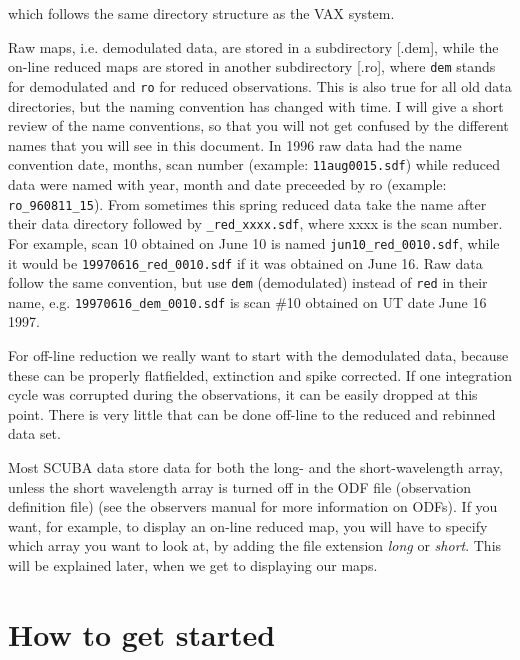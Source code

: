 \documentclass[twoside,11pt]{article}
\newcommand{\xlabel}[1]{}
\begin{document}
which follows the same directory structure as the VAX system.

Raw maps, i.e. demodulated data, are stored in a subdirectory [.dem],
while the on-line reduced maps are stored in another subdirectory
[.ro], where \texttt{dem} stands for demodulated and \texttt{ro} for
reduced observations. This is also true for all old data directories,
but the naming convention has changed with time. I will give a short
review of the name conventions, so that you will not get confused by
the different names that you will see in this document. In 1996 raw
data had the name convention date, months, scan number (example:
\texttt{11aug0015.sdf}) while reduced data were named with year, month
and date preceeded by ro (example: \texttt{ro\_960811\_15}). From
sometimes this spring reduced data take the name after their data
directory followed by \texttt{\_red\_xxxx.sdf}, where xxxx is the scan
number. For example, scan 10 obtained on June 10 is named
\texttt{jun10\_red\_0010.sdf}, while it would be
\texttt{19970616\_red\_0010.sdf} if it was obtained on June 16. Raw
data follow the same convention, but use \texttt{dem} (demodulated)
instead of \texttt{red} in their name, e.g.
\texttt{19970616\_dem\_0010.sdf} is scan \#10 obtained on UT date June
16 1997.

For off-line reduction we really want to start with the demodulated
data, because these can be properly flatfielded, extinction and spike
corrected. If one integration cycle was corrupted during the observations,
it can be easily dropped at this point. There is very little that can
be done off-line to the reduced and rebinned data set.
 
Most SCUBA data store data for both the long- and the short-wavelength
array, unless the short wavelength array is turned off in the ODF file
(observation definition file) (see the observers manual\cite{obsguide} for
more information on ODFs). If you want, for example, to display an
on-line reduced map, you will have to specify which array you want to
look at, by adding the file extension {\it long} or {\it short}. This
will be explained later, when we get to displaying our maps.

\section{\xlabel{how_to_get_started}How to get started}
\end{document}
